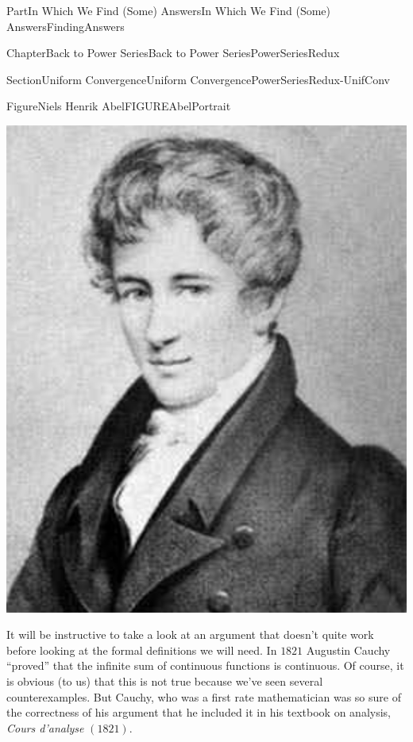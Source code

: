 \documentclass[oneside,10pt,]{book}
\numberwithin{equation}{part}
\newcommand{\abs}[1]{\left|#1\right|}
\newcommand{\eps}{\varepsilon}
\newcommand{\lt}{<}
\begin{document}
\begin{partptx}{Part}{In Which We Find (Some) Answers}{}{In Which We Find (Some) Answers}{}{}{FindingAnswers}
\begin{chapterptx}{Chapter}{Back to Power Series}{}{Back to Power Series}{}{}{PowerSeriesRedux}
\begin{sectionptx}{Section}{Uniform Convergence}{}{Uniform Convergence}{}{}{PowerSeriesRedux-UnifConv}
\begin{figureptx}{Figure}{Niels Henrik Abel}{FIGUREAbelPortrait}{}
\begin{image}{0.325}{0.35}{0.325}{}
\includegraphics[width=\linewidth]{external/images/Abel.png}
\end{image}%
\tcblower
\end{figureptx}%
It will be instructive to take a look at an argument that doesn't quite work before looking at the formal definitions we will need.  In \(1821\) Augustin Cauchy ``proved'' that the infinite sum of continuous functions is continuous.  Of course, it is obvious (to us) that this is not true because we've seen several counterexamples.  But Cauchy, who was a first rate mathematician was so sure of the correctness of his argument that he included it in his textbook on analysis, \textit{Cours d'analyse} \((1821)\).%
\end{sectionptx}
\end{chapterptx}
\end{partptx}
\end{document}

